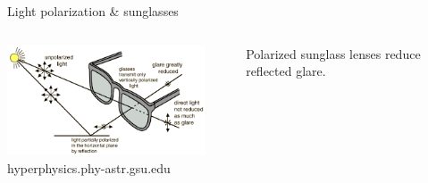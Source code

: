 %
%
%

\begin{frame}{Light polarization \& sunglasses}

\begin{columns}
  \begin{column}{0.45\textwidth}
    \begin{center}
       \includegraphics[width=0.90\textwidth]{./images/schematics/sunglass_polarization_principle.png}\\
       {\tiny
           hyperphysics.phy-astr.gsu.edu
       }
    \end{center}
  \end{column}
  \begin{column}{0.55\textwidth}
     Polarized sunglass lenses reduce reflected glare.\\
  \end{column}
\end{columns}


\end{frame}

